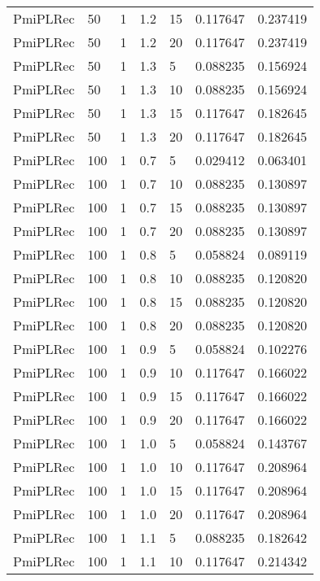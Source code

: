 \begin{tabular}{lllrlrr}
  PmiPLRec &   50 &     1 &   1.2 &   15 &     0.117647 &  0.237419 \\
  PmiPLRec &   50 &     1 &   1.2 &   20 &     0.117647 &  0.237419 \\
  PmiPLRec &   50 &     1 &   1.3 &    5 &     0.088235 &  0.156924 \\
  PmiPLRec &   50 &     1 &   1.3 &   10 &     0.088235 &  0.156924 \\
  PmiPLRec &   50 &     1 &   1.3 &   15 &     0.117647 &  0.182645 \\
  PmiPLRec &   50 &     1 &   1.3 &   20 &     0.117647 &  0.182645 \\
  PmiPLRec &  100 &     1 &   0.7 &    5 &     0.029412 &  0.063401 \\
  PmiPLRec &  100 &     1 &   0.7 &   10 &     0.088235 &  0.130897 \\
  PmiPLRec &  100 &     1 &   0.7 &   15 &     0.088235 &  0.130897 \\
  PmiPLRec &  100 &     1 &   0.7 &   20 &     0.088235 &  0.130897 \\
  PmiPLRec &  100 &     1 &   0.8 &    5 &     0.058824 &  0.089119 \\
  PmiPLRec &  100 &     1 &   0.8 &   10 &     0.088235 &  0.120820 \\
  PmiPLRec &  100 &     1 &   0.8 &   15 &     0.088235 &  0.120820 \\
  PmiPLRec &  100 &     1 &   0.8 &   20 &     0.088235 &  0.120820 \\
  PmiPLRec &  100 &     1 &   0.9 &    5 &     0.058824 &  0.102276 \\
  PmiPLRec &  100 &     1 &   0.9 &   10 &     0.117647 &  0.166022 \\
  PmiPLRec &  100 &     1 &   0.9 &   15 &     0.117647 &  0.166022 \\
  PmiPLRec &  100 &     1 &   0.9 &   20 &     0.117647 &  0.166022 \\
  PmiPLRec &  100 &     1 &   1.0 &    5 &     0.058824 &  0.143767 \\
  PmiPLRec &  100 &     1 &   1.0 &   10 &     0.117647 &  0.208964 \\
  PmiPLRec &  100 &     1 &   1.0 &   15 &     0.117647 &  0.208964 \\
  PmiPLRec &  100 &     1 &   1.0 &   20 &     0.117647 &  0.208964 \\
  PmiPLRec &  100 &     1 &   1.1 &    5 &     0.088235 &  0.182642 \\
  PmiPLRec &  100 &     1 &   1.1 &   10 &     0.117647 &  0.214342 \\

\end{tabular}
